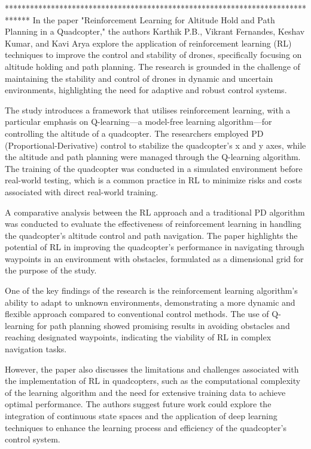 \documentclass{article}
\begin{document}
******************************************************************************
In the paper \cite{ReinforcementLearning} "Reinforcement Learning for Altitude Hold and Path Planning in a Quadcopter," the authors Karthik P.B., Vikrant Fernandes, Keshav Kumar, and Kavi Arya explore the application of reinforcement learning (RL) techniques to improve the control and stability of drones, specifically focusing on altitude holding and path planning. The research is grounded in the challenge of maintaining the stability and control of drones in dynamic and uncertain environments, highlighting the need for adaptive and robust control systems.

The study introduces a framework that utilises reinforcement learning, with a particular emphasis on Q-learning—a model-free learning algorithm—for controlling the altitude of a quadcopter. The researchers employed PD (Proportional-Derivative) control to stabilize the quadcopter's x and y axes, while the altitude and path planning were managed through the Q-learning algorithm. The training of the quadcopter was conducted in a simulated environment before real-world testing, which is a common practice in RL to minimize risks and costs associated with direct real-world training.

A comparative analysis between the RL approach and a traditional PD algorithm was conducted to evaluate the effectiveness of reinforcement learning in handling the quadcopter's altitude control and path navigation. The paper highlights the potential of RL in improving the quadcopter's performance in navigating through waypoints in an environment with obstacles, formulated as a dimensional grid for the purpose of the study.

One of the key findings of the research is the reinforcement learning algorithm's ability to adapt to unknown environments, demonstrating a more dynamic and flexible approach compared to conventional control methods. The use of Q-learning for path planning showed promising results in avoiding obstacles and reaching designated waypoints, indicating the viability of RL in complex navigation tasks.

However, the paper also discusses the limitations and challenges associated with the implementation of RL in quadcopters, such as the computational complexity of the learning algorithm and the need for extensive training data to achieve optimal performance. The authors suggest future work could explore the integration of continuous state spaces and the application of deep learning techniques to enhance the learning process and efficiency of the quadcopter's control system.
\end{document}
